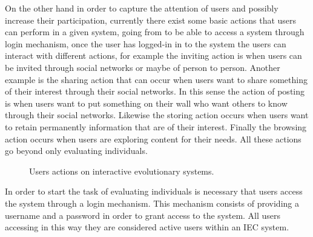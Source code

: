 On the other hand in order to capture the attention of users and possibly
increase their participation, currently there exist some basic actions that
users can perform in a given system, going from to be able to access a system
through login mechanism, once the user has logged-in in to the system the users
can interact with different actions, for example the inviting action is when
users can be invited through social networks or maybe of person to person.
Another example is the sharing action that can occur when users want to share
something of their interest through their social networks. In this sense the
action of posting is when users want to put something on their wall who want
others to know through their social networks. Likewise the storing action occurs
when users want to retain permanently information that are of their interest.
Finally the browsing action occurs when users are exploring content for their
needs. All these actions go beyond only evaluating individuals.

\begin{figure}
	\captionsetup{justification=centering,margin=2cm}
	\centering
	\setlength\fboxsep{0pt}
	\setlength\fboxrule{0.7pt}
	\caption{Users actions on interactive evolutionary systems.}
	\label{fig:users}
\end{figure}

In order to start the task of evaluating individuals is necessary that users
access the system through a login mechanism. This mechanism consists of
providing a username and a password in order to grant access to the system. All
users accessing in this way they are considered active users within an IEC
system.

